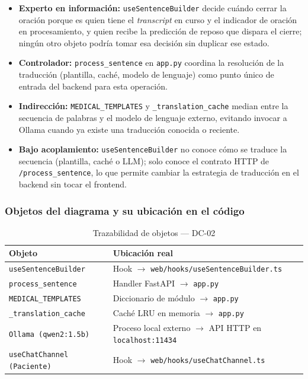 \begin{itemize}[leftmargin=*, itemsep=2pt]
    \item \textbf{Experto en información:} \texttt{useSentenceBuilder} decide
    cuándo cerrar la oración porque es quien tiene el \textit{transcript}
    en curso y el indicador de oración en procesamiento, y quien recibe la
    predicción de reposo que dispara el cierre; ningún otro objeto podría
    tomar esa decisión sin duplicar ese estado.
    \item \textbf{Controlador:} \texttt{process\_sentence} en \texttt{app.py}
    coordina la resolución de la traducción (plantilla, caché, modelo de
    lenguaje) como punto único de entrada del backend para esta operación.
    \item \textbf{Indirección:} \texttt{MEDICAL\_TEMPLATES} y
    \texttt{\_translation\_cache} median entre la secuencia de palabras y el
    modelo de lenguaje externo, evitando invocar a Ollama cuando ya existe
    una traducción conocida o reciente.
    \item \textbf{Bajo acoplamiento:} \texttt{useSentenceBuilder} no conoce
    cómo se traduce la secuencia (plantilla, caché o LLM); solo conoce el
    contrato HTTP de \texttt{/process\_sentence}, lo que permite cambiar la
    estrategia de traducción en el backend sin tocar el frontend.
\end{itemize}

\subsubsection{Objetos del diagrama y su ubicación en el código}

\begin{table}[H]
\centering
\begin{tabularx}{\textwidth}{@{}l X@{}}
\toprule
\textbf{Objeto} & \textbf{Ubicación real} \\
\midrule
\texttt{useSentenceBuilder} & Hook $\rightarrow$ \texttt{web/hooks/useSentenceBuilder.ts} \\
\texttt{process\_sentence} & Handler FastAPI $\rightarrow$ \texttt{app.py} \\
\texttt{MEDICAL\_TEMPLATES} & Diccionario de módulo $\rightarrow$ \texttt{app.py} \\
\texttt{\_translation\_cache} & Caché LRU en memoria $\rightarrow$ \texttt{app.py} \\
\texttt{Ollama (qwen2:1.5b)} & Proceso local externo $\rightarrow$ API HTTP en \texttt{localhost:11434} \\
\texttt{useChatChannel (Paciente)} & Hook $\rightarrow$ \texttt{web/hooks/useChatChannel.ts} \\
\bottomrule
\end{tabularx}
\caption{Trazabilidad de objetos --- DC-02}
\label{tab:col-objetos-dc02}
\end{table}


